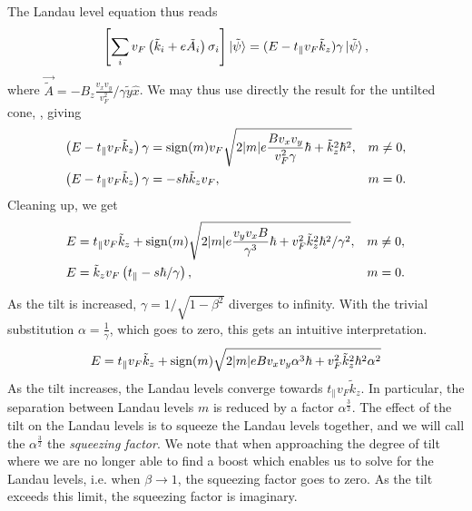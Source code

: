 The Landau level equation thus reads
\begin{equation}
  \label{eq:19}
  \left[
  \sum\limits_{i} v_{F} \left(\tilde{k}_{i} + e \tilde{A}_{i} \right) \sigma _{i}
\right  ] \ket{\tilde{\psi}} =
(E- t_{\parallel} v_{F} \tilde{k}_{z}) \gamma \ket{\tilde{\psi}},
\end{equation}
where \(\vec{\tilde{A}}=-B_{z} \frac{v_{x} v_{y} }{v_{F}^2} / \gamma  \tilde{y} \hat{x}\).
We may thus use directly the result for the untilted cone, , giving
\begin{align}
  \label{eq:20}
  \left(E - t_{\parallel} v_{F} \tilde{k}_{z} \right) \gamma &= \operatorname{sign} (m) v_{F} \sqrt{2 |m| e \frac{B v_{x} v_{y}}{ v_{F} ^2 \gamma } \hbar + \tilde{k}_{z}^2 \hbar ^2}, & m \neq 0,\\
  \left(E - t_{\parallel} v_{F} \tilde{k}_{z} \right) \gamma &= - s \hbar  \tilde{k}_{z} v_{F}, & m=0.
\end{align}
Cleaning up, we get
\begin{align}
  \label{eq:21}
  E &= t_{\parallel} v_F \tilde{k}_{z} + \operatorname{sign}(m) \sqrt{2 |m| e \frac{v_{y} v_{x} B}{\gamma ^3} \hbar + v_{F}^2 \tilde{k}_{z}^2\hbar ^2 /\gamma ^2}, & m\neq 0,\\
  E &= \tilde{k}_{z} v_{F} \left( t_{\parallel}  - s \hbar / \gamma  \right), & m=0.
\end{align}

As the tilt is increased, \(\gamma = 1 / \sqrt{1-\beta ^{2}}\) diverges to infinity.
With the trivial substitution \(\alpha = \frac{1}{\gamma }\), which goes to zero, this gets an intuitive interpretation.
\begin{equation}
  \label{eq:22}
  E = t_{\parallel} v_{F} \tilde{k}_{z} + \operatorname{sign}(m)  \sqrt{2 |m| e B v_{x} v_{y} \alpha  ^3 \hbar + v_{F} ^2 \tilde{k}_{z}^2\hbar ^2 \alpha ^2}
\end{equation}
As the tilt increases, the Landau levels converge towards \(t_{\parallel} v_{F} \tilde{k}_{z}\).
In particular, the separation between Landau levels \(m\)  is reduced by a factor \(\alpha ^{\frac{3}{2}}\).
The effect of the tilt on the Landau levels is to squeeze the Landau levels together, and we will call the \(\alpha ^{\frac{3}{2}}\) the \emph{squeezing factor}.
We note that when approaching the degree of tilt where we are no longer able to find a boost which enables us to solve for the Landau levels, i.e. when \(\beta \to 1\), the squeezing factor goes to zero.
As the tilt exceeds this limit, the squeezing factor is imaginary.

